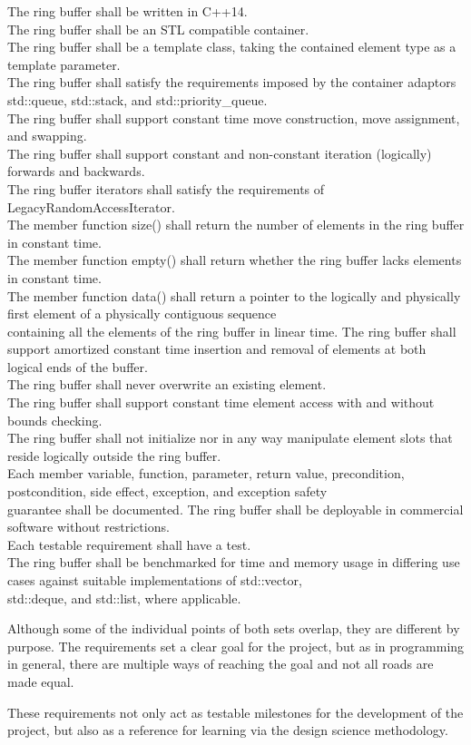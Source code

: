 The ring buffer shall be written in C++14. \\
The ring buffer shall be an STL compatible container.\\
The ring buffer shall be a template class, taking the contained element type as a template parameter.\\
The ring buffer shall satisfy the requirements imposed by the container adaptors std::queue, std::stack, and std::priority\_queue.\\
The ring buffer shall support constant time move construction, move assignment, and swapping.\\
The ring buffer shall support constant and non-constant iteration (logically) forwards and backwards.\\
The ring buffer iterators shall satisfy the requirements of LegacyRandomAccessIterator.\\
The member function size() shall return the number of elements in the ring buffer in constant time.\\
The member function empty() shall return whether the ring buffer lacks elements in constant time.\\
The member function data() shall return a pointer to the logically and physically first element of a physically contiguous sequence \\containing all the elements of the ring buffer in linear time.
The ring buffer shall support amortized constant time insertion and removal of elements at both logical ends of the buffer.\\
The ring buffer shall never overwrite an existing element.\\
The ring buffer shall support constant time element access with and without bounds checking.\\
The ring buffer shall not initialize nor in any way manipulate element slots that reside logically outside the ring buffer.\\
Each member variable, function, parameter, return value, precondition, postcondition, side effect, exception, and exception safety \\guarantee shall be documented.
The ring buffer shall be deployable in commercial software without restrictions.\\
Each testable requirement shall have a test.\\
The ring buffer shall be benchmarked for time and memory usage in differing use cases against suitable implementations of std::vector, \\std::deque, and std::list, where applicable.

Although some of the individual points of both sets overlap, they are different by purpose. The requirements set a clear goal for the project, but as in programming in general, there are multiple ways of reaching the goal and not all roads are made equal. 


These requirements not only act as testable milestones for the development of the project, but also as a reference for learning via the design science methodology.